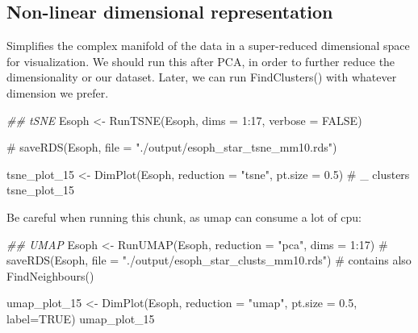 \documentclass[
  letterpaper,
  DIV=11,
  numbers=noendperiod]{scrreprt}
\newenvironment{Shaded}{\begin{snugshade}}{\end{snugshade}}
\newcommand{\AttributeTok}[1]{\textcolor[rgb]{0.40,0.45,0.13}{#1}}
\newcommand{\CommentTok}[1]{\textcolor[rgb]{0.37,0.37,0.37}{#1}}
\newcommand{\ConstantTok}[1]{\textcolor[rgb]{0.56,0.35,0.01}{#1}}
\newcommand{\DecValTok}[1]{\textcolor[rgb]{0.68,0.00,0.00}{#1}}
\newcommand{\DocumentationTok}[1]{\textcolor[rgb]{0.37,0.37,0.37}{\textit{#1}}}
\newcommand{\FloatTok}[1]{\textcolor[rgb]{0.68,0.00,0.00}{#1}}
\newcommand{\FunctionTok}[1]{\textcolor[rgb]{0.28,0.35,0.67}{#1}}
\newcommand{\NormalTok}[1]{\textcolor[rgb]{0.00,0.23,0.31}{#1}}
\newcommand{\OtherTok}[1]{\textcolor[rgb]{0.00,0.23,0.31}{#1}}
\newcommand{\SpecialCharTok}[1]{\textcolor[rgb]{0.37,0.37,0.37}{#1}}
\newcommand{\StringTok}[1]{\textcolor[rgb]{0.13,0.47,0.30}{#1}}
\begin{document}
\subsection{Non-linear dimensional
representation}\label{non-linear-dimensional-representation}

Simplifies the complex manifold of the data in a super-reduced
dimensional space for visualization. We should run this after PCA, in
order to further reduce the dimensionality or our dataset. Later, we can
run FindClusters() with whatever dimension we prefer.

\begin{Shaded}
\begin{Highlighting}[]
\DocumentationTok{\#\# tSNE}
\NormalTok{Esoph }\OtherTok{\textless{}{-}} \FunctionTok{RunTSNE}\NormalTok{(Esoph, }\AttributeTok{dims =} \DecValTok{1}\SpecialCharTok{:}\DecValTok{17}\NormalTok{, }\AttributeTok{verbose =} \ConstantTok{FALSE}\NormalTok{)}

\CommentTok{\# saveRDS(Esoph, file = "./output/esoph\_star\_tsne\_mm10.rds")}

\NormalTok{tsne\_plot\_15 }\OtherTok{\textless{}{-}} \FunctionTok{DimPlot}\NormalTok{(Esoph, }\AttributeTok{reduction =} \StringTok{"tsne"}\NormalTok{, }\AttributeTok{pt.size =} \FloatTok{0.5}\NormalTok{) }\CommentTok{\# \_ clusters}
\NormalTok{tsne\_plot\_15}
\end{Highlighting}
\end{Shaded}

Be careful when running this chunk, as umap can consume a lot of cpu:

\begin{Shaded}
\begin{Highlighting}[]
\DocumentationTok{\#\# UMAP}
\NormalTok{Esoph }\OtherTok{\textless{}{-}} \FunctionTok{RunUMAP}\NormalTok{(Esoph, }\AttributeTok{reduction =} \StringTok{"pca"}\NormalTok{, }\AttributeTok{dims =} \DecValTok{1}\SpecialCharTok{:}\DecValTok{17}\NormalTok{)}
\CommentTok{\# saveRDS(Esoph, file = "./output/esoph\_star\_clusts\_mm10.rds") \# contains also FindNeighbours()}
\end{Highlighting}
\end{Shaded}

\begin{Shaded}
\begin{Highlighting}[]
\NormalTok{umap\_plot\_15 }\OtherTok{\textless{}{-}} \FunctionTok{DimPlot}\NormalTok{(Esoph, }\AttributeTok{reduction =} \StringTok{"umap"}\NormalTok{, }\AttributeTok{pt.size =} \FloatTok{0.5}\NormalTok{, }\AttributeTok{label=}\ConstantTok{TRUE}\NormalTok{)}
\NormalTok{umap\_plot\_15}
\end{Highlighting}
\end{Shaded}
\end{document}
